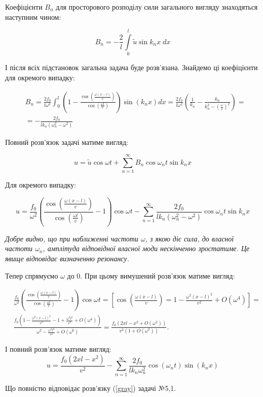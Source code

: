 Коефіцієнти $B_n$ для просторового розподілу сили загального вигляду знаходяться наступним чином:

\begin{equation} 
    B_n = -\frac 2l \int\limits_0^l \tilde{u} \sin k_nx \;dx
\end{equation}

І після всіх підстановок загальна задача буде розв'язана. Знайдемо ці коефіцієнти для окремого випадку:

\begin{equation} 
    \begin{aligned}
        &B_n = \frac {2f_0}{l\omega^2} \int_0^l\left(1-\frac{\cos\left(\frac{\omega (x-l)}{v}\right)}{\cos\left(\frac{\omega l}{v}\right)}\right)\sin(k_nx)dx=\frac {2f_0}{l\omega^2}\left(\frac{1}{k_n}-\frac{k_n}{k_n^2-\left(\frac \omega{v}\right)^2}\right)=\\
        &=-\frac{2f_0}{lk_n\left(\omega_n^2-\omega^2\right)}
    \end{aligned}    
\end{equation}

Повний розв'язок задачі матиме вигляд:

\begin{equation} \label{nosleep}
    u = \tilde{u}\cos{\omega t} + \sum_{n=1}^\infty B_n\cos\omega_nt\sin k_nx
\end{equation}

Для окремого випадку:

\begin{equation} 
    u = \frac{f_0}{\omega^2} \left(\frac{\cos\left(\frac{\omega (x-l)}{v}\right)}{\cos\left(\frac{\omega l}{v}\right)}-1\right) \cos{\omega t} - \sum_{n=1}^\infty \frac{2f_0}{lk_n\left(\omega_n^2-\omega^2\right)} \cos\omega_nt\sin k_nx
\end{equation}

\textit{Добре видно, що при наближенні частоти $\omega$, з якою діє сила, до власної частоти $\omega_n$, амплітуда відповідної власної моди нескінченно зростатиме. Це явище відповідає визначенню резонансу.}

Тепер спрямуємо $\omega$ до 0. При цьому вимушений розв'язок матиме вигляд:

\begin{equation*}
    \begin{aligned}
        &\frac {f_0}{\omega^2}\left(\frac{\cos\left(\frac{\omega (x-l)}{v}\right)}{\cos\left(\frac{\omega l}{v}\right)}-1\right)\cos{\omega t}=\left[ \cos\left(\frac{\omega (x-l)}{v}\right)=1-\frac{\omega^2 (x-l)^2}{v^2}+O(\omega^4)\right]=\\
        &\frac {f_0\left(1-\frac{\omega^2 (x-l)^2}{v^2}-1+\frac{\omega^2 l^2}{v^2}+O(\omega^4)\right)}{\omega^2-\frac{\omega^4 l^2}{v^2}+O(\omega^6)}=\frac {f_0\left( 2xl-x^2+O(\omega^2)\right)}{v^2(1+O(\omega^2))}.
    \end{aligned}
\end{equation*}

І повний розв'язок матиме вигляд:
\begin{equation} 
    u = \frac{f_0\left( 2xl-x^2\right)}{v^2} - \sum_{n=1}^\infty \frac{2f_0}{lk_n\omega_n^2}\cos(\omega_n t)\sin(k_n x)
\end{equation}

Що повністю відповідає розв'язку (\ref{gray}) задачі  №5,1.

%
